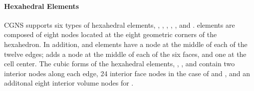 {{{\paragraph{Hexahedral Elements}
CGNS supports six types of hexahedral elements, ,
, , , , and .
 elements are composed of eight nodes located at the
eight geometric corners of the hexahedron.
In addition,  and  elements have a node
at the middle of each of the twelve edges;  adds a
node at the middle of each of the six faces, and one at the cell center.
The cubic forms of the hexahedral elements, ,
, and 
contain two interior nodes along each edge, 24 interior face nodes
in the case of  and , and an additonal
eight interior volume nodes for .


}}}

